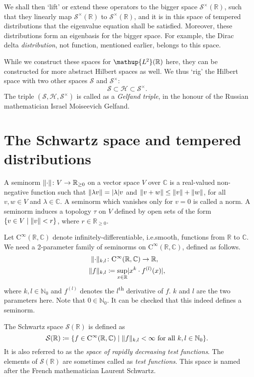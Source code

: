 \documentclass[12pt, a4 paper]{article}
\theoremstyle{definition}
\newcommand{\ltwo}{\mathup{L\kern-0.5pt^2}}
\newcommand{\rr}{\mathbb{R}}
\newcommand{\cc}{\mathbb{C}}
\newcommand{\nn}{\mathbb{N}_0}
\newcommand{\hilbert}{\mathcal{H}}
\newcommand{\ltwor}{\ltwo(\rr)}
\newcommand{\schwartz}{\mathcal{S}}
\newcommand{\schwartzr}{\schwartz(\rr)}
\newcommand{\dist}{\schwartz^\times}
\newcommand{\distr}{\dist(\rr)}
\newcommand{\cinfinity}{\mathrm{C}^\infty}
\DeclarePairedDelimiter{\norm}{\lVert}{\rVert}
\DeclarePairedDelimiter{\abs}{\lvert}{\rvert}
\begin{document}
	We shall then `lift' or extend these operators to the bigger space $\distr$, such that they linearly map $\distr$ to $\distr$, and it is in this space of tempered distributions that the eigenvalue equation shall be satisfied. Moreover, these distributions form an eigenbasis for the bigger space. For example, the Dirac delta \textit{distribution}, not function, mentioned earlier, belongs to this space.

	While we construct these spaces for $\ltwor$ here, they can be constructed for more abstract Hilbert spaces as well. We thus `rig' the Hilbert space with two other spaces $\mathcal{S}$ and $\mathcal{S}^\times$:
	\[
	\mathcal{S} \subset \hilbert \subset \mathcal{S}^\times.
	\]
	The triple $(\mathcal{S}, \hilbert, \mathcal{S}^\times)$ is called as a \textit{Gelfand triple}, in the honour of the Russian mathematician Israel Moiseevich Gelfand.

	\section{The Schwartz space and tempered distributions}

	A seminorm $\norm{\cdot} \colon V \rightarrow \rr_{\geq 0}$ on a vector space $V$ over $\cc$ is a real-valued non-negative function such that $\norm{\lambda v} = \abs{\lambda} v$ and $\norm{v + w} \leq \norm{v} + \norm{w}$, for all $v,w \in V$ and $\lambda \in \cc$. A seminorm which vanishes only for $v=0$ is called a norm. A seminorm induces a topology $\tau$ on $V$ defined by open sets of the form $\{v\in V \mid \norm{v} < r\}$, where $r \in \rr_{\geq 0}$.

	Let $\cinfinity(\rr, \cc)$ denote infinitely-differentiable, i.e.\@ smooth, functions from $\rr$ to $\cc$. We need a 2-parameter family of seminorms on $\cinfinity(\rr, \cc)$, defined as follows.
	\begin{align*}
		\norm{\cdot}_{k,l} &\colon \cinfinity(\rr, \cc) \rightarrow \rr,\\
		\norm{f}_{k,l} &\coloneq \sup_{x \in \rr}\abs{x^k \cdot f^{(l)}(x)},
	\end{align*}
	where $k, l \in \nn$ and $f^{(l)}$ denotes the $l$\textsuperscript{th} derivative of $f$. $k$ and $l$ are the two parameters here. Note that $0 \in \nn$. It can be checked that this indeed defines a seminorm.

	The Schwartz space $\schwartzr$ is defined as
	\[
	\schwartzr \coloneq \{f \in \cinfinity(\rr, \cc) \mid \norm{f}_{k,l} < \infty \text{ for all } k, l \in \nn\}.
	\]
	It is also referred to as the \textit{space of rapidly decreasing test functions}. The elements of $\schwartzr$ are sometimes called as \textit{test functions}. This space is named after the French mathematician Laurent Schwartz.
\end{document}
